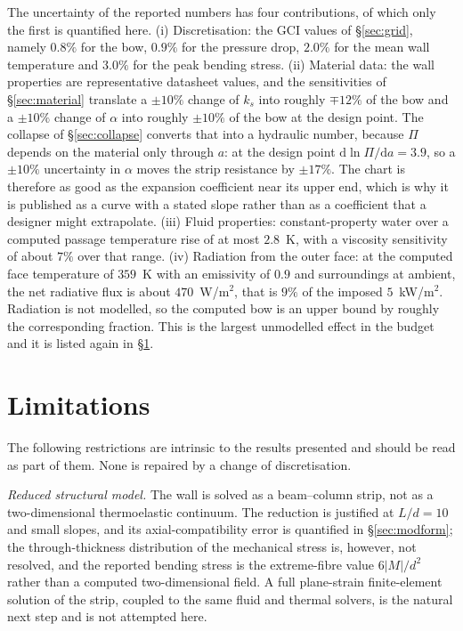 \documentclass[11pt,a4paper]{article}
\newcommand{\dd}{\mathrm{d}}
\begin{document}
The uncertainty of the reported numbers has four contributions, of which only
the first is quantified here.
(i) Discretisation: the GCI values of \S\ref{sec:grid}, namely $0.8\%$ for the
bow, $0.9\%$ for the pressure drop, $2.0\%$ for the mean wall temperature and
$3.0\%$ for the peak bending stress.
(ii) Material data: the wall properties are representative datasheet values,
and the sensitivities of \S\ref{sec:material} translate a $\pm10\%$ change of
$k_s$ into roughly $\mp12\%$ of the bow and a $\pm10\%$ change of $\alpha$ into
roughly $\pm10\%$ of the bow at the design point. The collapse of
\S\ref{sec:collapse} converts that into a hydraulic number, because $\Pi$ depends
on the material only through $a$: at the design point $\dd\ln\Pi/\dd a=3.9$, so a
$\pm10\%$ uncertainty in $\alpha$ moves the strip resistance by $\pm17\%$. The chart
is therefore as good as the expansion coefficient near its upper end, which is why
it is published as a curve with a stated slope rather than as a coefficient that a
designer might extrapolate.
(iii) Fluid properties: constant-property water over a computed passage
temperature rise of at most $2.8$~K, with a viscosity sensitivity of about
$7\%$ over that range.
(iv) Radiation from the outer face: at the computed face temperature of
$359$~K with an emissivity of $0.9$ and surroundings at ambient, the net
radiative flux is about $470$~W/m$^2$, that is $9\%$ of the imposed
$5$~kW/m$^2$. Radiation is not modelled, so the computed bow is an upper
bound by roughly the corresponding fraction. This is the largest unmodelled
effect in the budget and it is listed again in \S\ref{sec:limitations}.


\section{Limitations}
\label{sec:limitations}

The following restrictions are intrinsic to the results presented and should
be read as part of them. None is repaired by a change of discretisation.

\emph{Reduced structural model.} The wall is solved as a beam--column strip,
not as a two-dimensional thermoelastic continuum. The reduction is justified
at $L/d=10$ and small slopes, and its axial-compatibility error is quantified
in \S\ref{sec:modform}; the through-thickness distribution of the mechanical
stress is, however, not resolved, and the reported bending stress is the
extreme-fibre value $6|M|/d^2$ rather than a computed two-dimensional field.
A full plane-strain finite-element solution of the strip, coupled to the same
fluid and thermal solvers, is the natural next step and is not attempted here.
\end{document}

